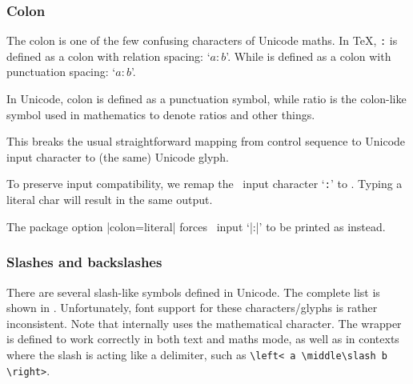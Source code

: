 \subsubsection{Colon}

The colon is one of the few confusing characters of Unicode maths.
In \TeX, \texttt{:} is defined as a colon with relation spacing: `$a:b$'.
While  is defined as a colon with punctuation spacing: `$a\colon b$'.

In Unicode,  {colon} is defined as a punctuation symbol,
while  {ratio} is the colon-like symbol used in mathematics to denote
ratios and other things.

This breaks the usual straightforward mapping from control sequence to Unicode input character
to (the same) Unicode glyph.

To preserve input compatibility, we remap the \ascii\ input character `\texttt{:}' to .
Typing a literal  char will result in the same output.

The package option |colon=literal| forces \ascii\ input `|:|' to be printed as  instead.


\subsubsection{Slashes and backslashes}

There are several slash-like symbols defined in Unicode.
The complete list is shown in . Unfortunately, font support for these characters/glyphs is rather inconsistent.
Note that  internally uses the  mathematical character.
The wrapper  is defined to work correctly in both text and maths mode, as well as in contexts where the slash is acting like a delimiter, such as \verb|\left< a \middle\slash b \right>|.

